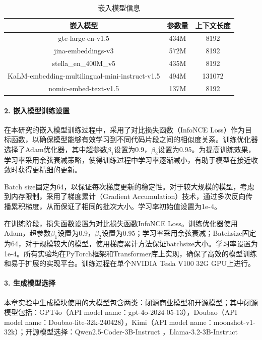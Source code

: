     \begin{table}[htbp]
    \caption{嵌入模型信息}
    \label{2_嵌入模型参数量}
    \vspace{0.5em}\centering\wuhao
    \begin{tabular}{ccc}
    \toprule
    嵌入模型 & 参数量 & 上下文长度  \\
    \midrule
    gte-large-en-v1.5 & 434M & 8192 \\
    jina-embeddings-v3 & 572M & 8192\\
    stella\_en\_400M\_v5 & 435M & 8192 \\
    KaLM-embedding-multilingual-mini-instruct-v1.5 & 494M & 131072 \\
    nomic-embed-text-v1.5 & 137M & 8192 \\
    \bottomrule
    \end{tabular}
    \end{table}
    
\paragraph{2. 嵌入模型训练设置}
在本研究的嵌入模型训练过程中，采用了对比损失函数（InfoNCE Loss）作为目标函数，以确保模型能够有效学习到不同代码片段之间的相似度关系。训练优化器选择了Adam优化器，其中超参数$\beta_1$设置为0.9，$\beta_2$设置为0.95。为提高训练效果，学习率采用余弦衰减策略，使得训练过程中学习率逐渐减小，有助于模型在接近收敛时获得更精细的更新。

Batch size固定为64，以保证每次梯度更新的稳定性。对于较大规模的模型，考虑到内存限制，采用了梯度累计（Gradient Accumulation）技术，通过多次反向传播累积梯度，从而保证了相同的批次大小。学习率初始值设置为1e-4。

在训练阶段，损失函数设置为对比损失函数InfoNCE Loss。训练优化器使用Adam，超参数$\beta_1$设置为0.9，$\beta_2$设置为0.95；学习率采用余弦衰减；Batchsize固定为64，对于规模较大的模型，使用梯度累计方法保证batchsize大小。学习率设置为1e-4。所有实验均在PyTorch框架和Transformer库上实现，确保了高效的模型训练和易于扩展的实现平台。训练过程在单个NVIDIA Tesla V100 32G GPU上进行。
    
\paragraph{3. 生成模型选择}
本章实验中生成模块使用的大模型包含两类：闭源商业模型和开源模型；其中闭源模型包括：GPT4o（API model name：gpt-4o-2024-05-13），Doubao（API model name：Doubao-lite-32k-240428），Kimi（API model name：moonshot-v1-32k）；开源模型选择：Qwen2.5-Coder-3B-Instruct ，Llama-3.2-3B-Instruct



